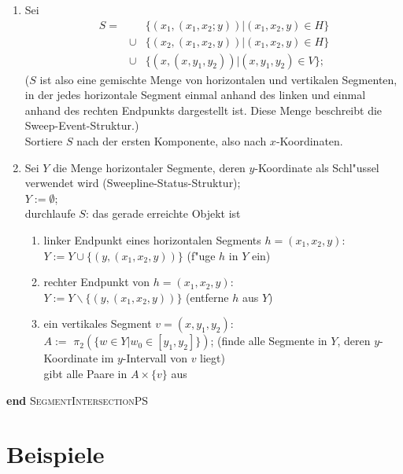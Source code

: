 \documentclass[draft,12pt]{scrreprt}
\theoremstyle{break}
\begin{document}
\begin{enumerate}
\item
Sei \begin{displaymath}
  \begin{array}{rcl}
  S =&& \{(x_1, (x_1,x_2;y)) | (x_1,x_2,y)\in H\}\\
  &\cup& \{(x_2,(x_1,x_2,y)) | (x_1,x_2,y)\in H\}\\
  &\cup& \{(x,(x,y_1,y_2)) | (x,y_1,y_2)\in V\};
\end{array}
\end{displaymath}
($S$ ist also eine gemischte Menge von horizontalen und vertikalen Segmenten,
in der jedes horizontale Segment einmal anhand des linken und einmal
anhand des rechten Endpunkts dargestellt ist. Diese Menge beschreibt die
Sweep-Event-Struktur.)\\
Sortiere $S$ nach der ersten Komponente, also nach $x$-Koordinaten.

\item
Sei $Y$ die Menge horizontaler Segmente, deren $y$-Koordinate als
Schl"ussel verwendet wird (Sweepline-Status-Struktur);\\
$Y:=\emptyset$;\\
durchlaufe $S$: das gerade erreichte Objekt ist
\begin{enumerate}
\item
linker Endpunkt eines horizontalen Segments $h=(x_1,x_2,y)$:\\
$Y := Y \cup \{(y,(x_1,x_2,y))\}$ (f"uge $h$ in $Y$ ein)
\item
rechter Endpunkt von $h=(x_1,x_2,y)$:\\
$Y := Y \backslash \{(y,(x_1,x_2,y))\}$ (entferne $h$ aus $Y$)
\item
ein vertikales Segment $v=(x,y_1,y_2)$:\\
$A :=$ 
$\pi_2 (\{w\in Y | w_0 \in [y_1,y_2] \})$;
 \hspace{1cm}  (finde alle Segmente in $Y$, deren
   $y$-Koordinate im $y$-Intervall von $v$ liegt)\\
gibt alle Paare in $A\times\{v\}$ aus
\end{enumerate}
\end{enumerate}
\textbf{end} \textsc{SegmentIntersectionPS} 

\chapter{Beispiele}
\end{document}
